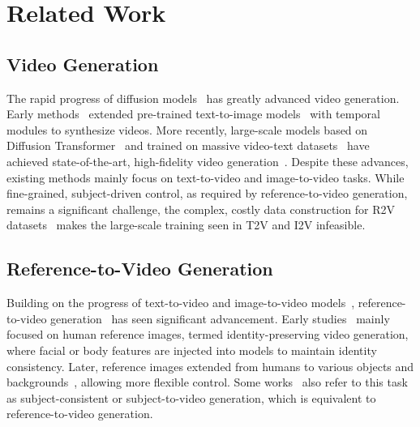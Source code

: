 \section{Related Work}
\label{saber:sec:related_work}


\subsection{Video Generation}
The rapid progress of diffusion models~\citep{rombach2022high} has greatly advanced video generation.
Early methods~\citep{blattmann2023stable, guo2023animatediff, chen2024gentron} extended pre-trained text-to-image models~\citep{rombach2022high, podell2023sdxl} with temporal modules to synthesize videos.
More recently, large-scale models based on Diffusion Transformer~\citep{peebles2023scalable} and trained on massive video-text datasets~\citep{chen2024panda, wang2025koala} have achieved state-of-the-art, high-fidelity video generation~\citep{yang2024cogvideox, kong2024hunyuanvideo, chen2025goku, wan2025wan, gao2025seedance, zhang2025waver}. 
Despite these advances, existing methods mainly focus on text-to-video and image-to-video tasks.
While fine-grained, subject-driven control, as required by reference-to-video generation, remains a significant challenge, the complex, costly data construction for R2V datasets~\citep{yuan2025opens2v, liu2025phantom} makes the large-scale training seen in T2V and I2V infeasible.

\subsection{Reference-to-Video Generation}
Building on the progress of text-to-video and image-to-video models~\citep{hong2022cogvideo, yang2024cogvideox, kong2024hunyuanvideo, hacohen2024ltx, wan2025wan}, reference-to-video generation~\citep{yuan2025identity, jiang2025vace, liu2025phantom, hu2025hunyuancustom, hu2025polyvivid, li2025bindweave} has seen significant advancement.
Early studies~\citep{gao2025identity, yuan2025identity, shen2025identity} mainly focused on human reference images, termed identity-preserving video generation, where facial or body features are injected into models to maintain identity consistency.
Later, reference images extended from humans to various objects and backgrounds~\citep{liu2025phantom, jiang2025vace, hu2025hunyuancustom}, allowing more flexible control.
Some works~\citep{liu2025phantom, yuan2025opens2v} also refer to this task as subject-consistent or subject-to-video generation, which is equivalent to reference-to-video generation.

